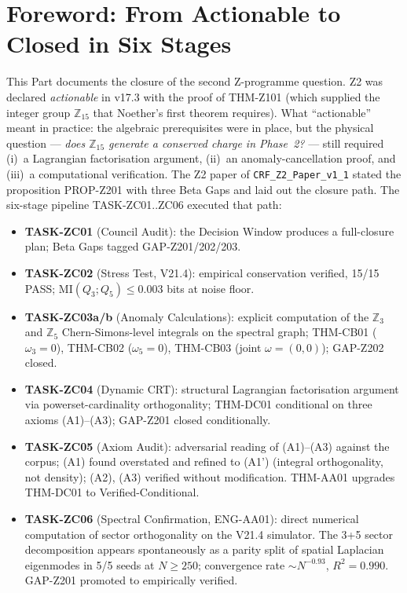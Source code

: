 \documentclass[12pt, a4paper]{article}
\begin{document}
\section{Foreword: From Actionable to Closed in Six Stages}

This Part documents the closure of the second Z-programme question.
Z2 was declared \emph{actionable} in v17.3 with the proof of
THM-Z101 (which supplied the integer group $\mathbb{Z}_{15}$ that
Noether's first theorem requires). What ``actionable'' meant in
practice: the algebraic prerequisites were in place, but the
physical question --- \emph{does $\mathbb{Z}_{15}$ generate a
conserved charge in Phase~2?} --- still required (i)~a Lagrangian
factorisation argument, (ii)~an anomaly-cancellation proof, and
(iii)~a computational verification. The Z2 paper of
\texttt{CRF\_Z2\_Paper\_v1\_1} stated the proposition PROP-Z201 with
three Beta Gaps and laid out the closure path. The six-stage
pipeline TASK-ZC01..ZC06 executed that path:

\begin{itemize}[leftmargin=*]
\item \textbf{TASK-ZC01} (Council Audit): the Decision Window
  produces a full-closure plan; Beta Gaps tagged GAP-Z201/202/203.
\item \textbf{TASK-ZC02} (Stress Test, V21.4): empirical conservation
  verified, 15/15 PASS; $\mathrm{MI}(Q_3; Q_5) \le 0.003$ bits at
  noise floor.
\item \textbf{TASK-ZC03a/b} (Anomaly Calculations): explicit
  computation of the $\mathbb{Z}_3$ and $\mathbb{Z}_5$
  Chern-Simons-level integrals on the spectral graph;
  THM-CB01 ($\omega_3 = 0$), THM-CB02 ($\omega_5 = 0$),
  THM-CB03 (joint $\omega = (0,0)$); GAP-Z202 closed.
\item \textbf{TASK-ZC04} (Dynamic CRT): structural Lagrangian
  factorisation argument via powerset-cardinality orthogonality;
  THM-DC01 conditional on three axioms (A1)--(A3); GAP-Z201 closed
  conditionally.
\item \textbf{TASK-ZC05} (Axiom Audit): adversarial reading of
  (A1)--(A3) against the corpus; (A1) found overstated and refined
  to (A1') (integral orthogonality, not density); (A2), (A3)
  verified without modification. THM-AA01 upgrades THM-DC01 to
  Verified-Conditional.
\item \textbf{TASK-ZC06} (Spectral Confirmation, ENG-AA01): direct
  numerical computation of sector orthogonality on the V21.4
  simulator. The 3+5 sector decomposition appears spontaneously as a
  parity split of spatial Laplacian eigenmodes in 5/5 seeds at
  $N \ge 250$; convergence rate $\sim N^{-0.93}$, $R^2 = 0.990$.
  GAP-Z201 promoted to empirically verified.
\end{itemize}
\end{document}
